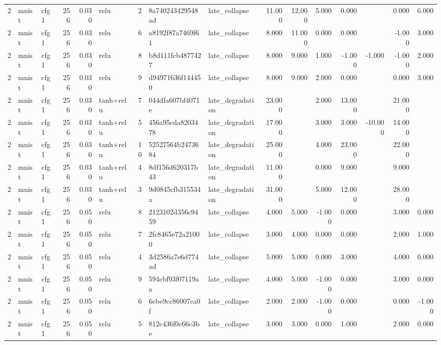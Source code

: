 \begin{table}[htbp]
{\begin{tabular}{@{}rllrrlrllrrrrrrr@{}}
2 & mnist & cfg1 & 256 & 0.030 & relu & 2 & 8a740243429548ad & late\_collapse & 11.000 & 12.000 & 5.000 & 0.000 &  & 0.000 & 6.000 \\
2 & mnist & cfg1 & 256 & 0.030 & relu & 6 & a8192f87a7469f61 & late\_collapse & 8.000 & 11.000 & 0.000 & 0.000 &  & -1.000 & 3.000 \\
2 & mnist & cfg1 & 256 & 0.030 & relu & 8 & b8d111fcb4877427 & late\_collapse & 8.000 & 9.000 & 1.000 & -1.000 & -1.000 & -1.000 & 2.000 \\
2 & mnist & cfg1 & 256 & 0.030 & relu & 9 & d94971636f144450 & late\_collapse & 8.000 & 9.000 & 2.000 & 0.000 &  & 0.000 & 3.000 \\
2 & mnist & cfg1 & 256 & 0.030 & tanh+relu & 7 & 044dfa607bf4071e & late\_degradation & 23.000 &  & 2.000 & 13.000 &  & 21.000 &  \\
2 & mnist & cfg1 & 256 & 0.030 & tanh+relu & 5 & 456a95cda8203478 & late\_degradation & 17.000 &  & 3.000 & 3.000 & -10.000 & 14.000 &  \\
2 & mnist & cfg1 & 256 & 0.030 & tanh+relu & 10 & 52527564b2473684 & late\_degradation & 25.000 &  & 4.000 & 23.000 &  & 22.000 &  \\
2 & mnist & cfg1 & 256 & 0.030 & tanh+relu & 4 & 8df156d620317b43 & late\_degradation & 11.000 &  & 0.000 & 9.000 &  & 9.000 &  \\
2 & mnist & cfg1 & 256 & 0.030 & tanh+relu & 3 & 9d0845cfb315534a & late\_degradation & 31.000 &  & 5.000 & 12.000 &  & 28.000 &  \\
2 & mnist & cfg1 & 256 & 0.050 & relu & 8 & 2123102d356c9459 & late\_collapse & 4.000 & 5.000 & -1.000 & 0.000 &  & 3.000 & 0.000 \\
2 & mnist & cfg1 & 256 & 0.050 & relu & 7 & 2fc8465e72a21000 & late\_collapse & 3.000 & 4.000 & 0.000 & 0.000 &  & 2.000 & 1.000 \\
2 & mnist & cfg1 & 256 & 0.050 & relu & 4 & 3d2586a7e6d774ad & late\_collapse & 5.000 & 5.000 & 0.000 & 3.000 &  & 4.000 & 0.000 \\
2 & mnist & cfg1 & 256 & 0.050 & relu & 9 & 594cbf93f07119aa & late\_collapse & 4.000 & 5.000 & -1.000 & 0.000 &  & 3.000 & 0.000 \\
2 & mnist & cfg1 & 256 & 0.050 & relu & 6 & 6ebe9cc86007ca0f & late\_collapse & 2.000 & 2.000 & -1.000 & 0.000 &  & 0.000 & -1.000 \\
2 & mnist & cfg1 & 256 & 0.050 & relu & 5 & 812c436f0c66c3be & late\_collapse & 3.000 & 3.000 & 0.000 & 1.000 &  & 2.000 & 0.000 \\

\end{tabular}}
\end{table}
